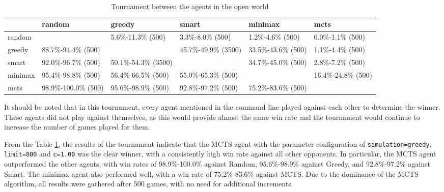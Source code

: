 \begin{table}[]
\captionsetup{justification=centering}
\begin{tabularx}{\textwidth}{|X|X|X|X|X|X|}
\toprule

                                        & random               & greedy               & smart                & minimax & mcts \\ \midrule
random                                  &                      & \footnotesize{5.6\%-11.3\% (500)}   & \footnotesize{3.3\%-8.0\% (500)}    & \footnotesize{1.2\%-4.6\% (500)}            & \footnotesize{0.0\%-1.1\% (500)}                       \\ \midrule
greedy                                  & \footnotesize{88.7\%-94.4\% (500)}  &                      & \footnotesize{45.7\%-49.9\% (3500)} & \footnotesize{33.5\%-43.6\% (500)}          & \footnotesize{1.1\%-4.4\% (500)}                       \\ \midrule
smart                                   & \footnotesize{92.0\%-96.7\% (500)}  & \footnotesize{50.1\%-54.3\% (3500)} &                      & \footnotesize{34.7\%-45.0\% (500)}          & \footnotesize{2.8\%-7.2\% (500)}                       \\ \midrule
minimax            & \footnotesize{95.4\%-98.8\% (500)}  & \footnotesize{56.4\%-66.5\% (500)}  & \footnotesize{55.0\%-65.3\% (500)}  &                              & \footnotesize{16.4\%-24.8\% (500)}                     \\ \midrule
mcts & \footnotesize{98.9\%-100.0\% (500)} & \footnotesize{95.6\%-98.9\% (500)}  & \footnotesize{92.8\%-97.2\% (500)}  & \footnotesize{75.2\%-83.6\% (500)}          &                                         \\ \bottomrule
\end{tabularx}
    \caption{Tournament between the agents in the open world}
    \label{tournamentOpenWorld}
\end{table}

It should be noted that in this tournament, every agent mentioned in the command line played against each other to determine the winner. These agents did not play against themselves, as this would provide almost the same win rate and the tournament would continue to increase the number of games played for them.

From the Table \ref{tournamentOpenWorld}, the results of the tournament indicate that the MCTS agent with the parameter configuration of \texttt{simulation=greedy}, \texttt{limit=800} and \texttt{c=1.00}  was the clear winner, with a consistently high win rate against all other opponents. In particular, the MCTS agent outperformed the other agents, with win rates of 98.9\%-100.0\% against Random, 95.6\%-98.9\% against Greedy, and 92.8\%-97.2\% against Smart. The minimax agent also performed well, with a win rate of 75.2\%-83.6\% against MCTS. Due to the dominance of the MCTS algorithm, all results were gathered after 500 games, with no need for additional increments.

